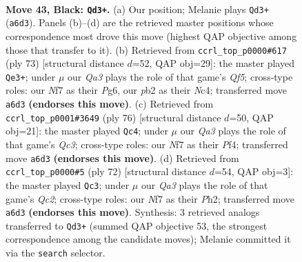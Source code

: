 \documentclass[11pt]{article}
\begin{document}
\clearpage

\begin{figure}[p]\centering
\begin{subfigure}{0.46\textwidth}\centering
\resizebox{\linewidth}{!}{%
\newchessgame
\chessboard[
  setfen={1k6/p1p2npp/qp2Q3/2p3P1/8/2P5/1P6/1K6 b - - 2 43},
  showmover=false,
  pgfstyle=straightmove, color=movearrow, markmove={a6-d3}
]}
\caption{}
\end{subfigure}\hfill
\begin{subfigure}{0.46\textwidth}\centering
\resizebox{\linewidth}{!}{%
\newchessgame
\chessboard[
  setfen={6k1/pp5p/5Qp1/3p1p2/2n2q2/P6P/6P1/B5K1 b - - 1 37},
  showmover=false,
  pgfstyle=straightmove, color=movearrow, markmove={f4-e3}
]}
\caption{}
\end{subfigure}
\\[4pt]
\begin{subfigure}{0.46\textwidth}\centering
\resizebox{\linewidth}{!}{%
\newchessgame
\chessboard[
  setfen={8/6pk/4p2p/4Pp2/3P1P2/2Q4P/5qPK/8 w - - 5 39},
  showmover=false,
  pgfstyle=straightmove, color=movearrow, markmove={c3-c4}
]}
\caption{}
\end{subfigure}\hfill
\begin{subfigure}{0.46\textwidth}\centering
\resizebox{\linewidth}{!}{%
\newchessgame
\chessboard[
  setfen={8/5ppk/4p3/7p/1q2P3/5PP1/1PQ3KP/8 w - - 6 37},
  showmover=false,
  pgfstyle=straightmove, color=movearrow, markmove={c2-c3}
]}
\caption{}
\end{subfigure}
\caption{\textbf{Move 43, Black: \texttt{Qd3+}.} (a) Our position; Melanie plays \texttt{Qd3+} (\texttt{a6d3}). Panels (b)--(d) are the retrieved master positions whose correspondence most drove this move (highest QAP objective among those that transfer to it). (b) Retrieved from \texttt{ccrl\_top\_p0000\#617} (ply 73) [structural distance $d$=52, QAP obj=29]: the master played \texttt{Qe3+}; under $\mu$ our \emph{Qa3} plays the role of that game's \emph{Qf5}; cross-type roles: our \emph{N}f7 as their \emph{P}g6, our \emph{p}b2 as their \emph{N}c4; transferred move \texttt{a6d3} \textbf{(endorses this move)}. (c) Retrieved from \texttt{ccrl\_top\_p0001\#3649} (ply 76) [structural distance $d$=50, QAP obj=21]: the master played \texttt{Qc4}; under $\mu$ our \emph{Qa3} plays the role of that game's \emph{Qc3}; cross-type roles: our \emph{N}f7 as their \emph{P}f4; transferred move \texttt{a6d3} \textbf{(endorses this move)}. (d) Retrieved from \texttt{ccrl\_top\_p0000\#5} (ply 72) [structural distance $d$=54, QAP obj=3]: the master played \texttt{Qc3}; under $\mu$ our \emph{Qa3} plays the role of that game's \emph{Qc2}; cross-type roles: our \emph{N}f7 as their \emph{P}h2; transferred move \texttt{a6d3} \textbf{(endorses this move)}. Synthesis: 3 retrieved analogs transferred to \texttt{Qd3+} (summed QAP objective 53, the strongest correspondence among the candidate moves); Melanie committed it via the \texttt{search} selector.}
\label{fig:thought-m85}
\end{figure}
\end{document}
